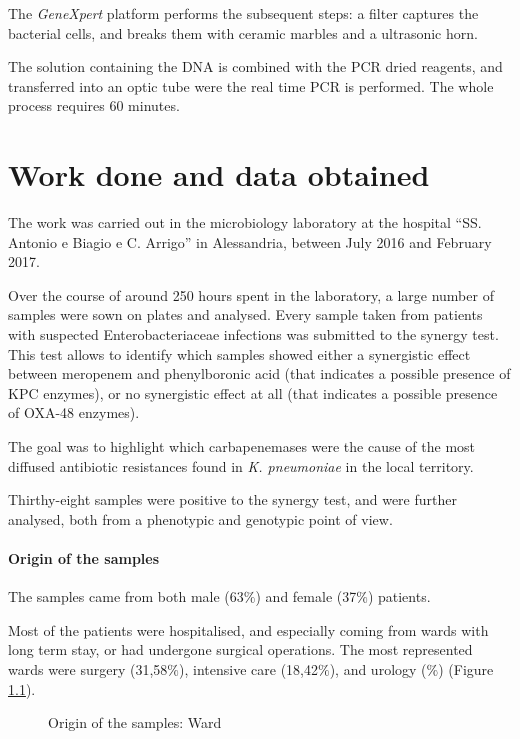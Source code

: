 \documentclass[11pt]{report}
\begin{document}
The \emph{GeneXpert} platform performs the subsequent steps: a filter captures the bacterial cells, and breaks them with ceramic marbles and a ultrasonic horn.

The solution containing the DNA is combined with the PCR dried reagents, and transferred into an optic tube were the real time PCR is performed.
The whole process requires 60 minutes.

\chapter{Work done and data obtained}

The work was carried out in the microbiology laboratory at the hospital ``SS. Antonio e Biagio e C. Arrigo'' in Alessandria, between July 2016 and February 2017.

Over the course of around 250 hours spent in the laboratory, a large number of samples were sown on plates and analysed.
Every sample taken from patients with suspected Enterobacteriaceae infections was submitted to the synergy test.
This test allows to identify which samples showed either a synergistic effect between meropenem and phenylboronic acid (that indicates a possible presence of KPC enzymes), or no synergistic effect at all (that indicates a possible presence of OXA-48 enzymes).

The goal was to highlight which carbapenemases were the cause of the most diffused antibiotic resistances found in \emph{K. pneumoniae} in the local territory.

Thirthy-eight samples were positive to the synergy test, and were further analysed, both from a phenotypic and genotypic point of view.

\clearpage

\subsubsection{Origin of the samples}

The samples came from both male (63$\%$) and female (37$\%$) patients.

Most of the patients were hospitalised, and especially coming from wards with long term stay, or had undergone surgical operations.
The most represented wards were surgery (31,58$\%$), intensive care (18,42$\%$), and urology ($\%$) (Figure \ref{wards}).

\begin{figure}[h!]
\centering
{}
\caption{Origin of the samples: Ward}
\label{wards}
\end{figure}
\end{document}

